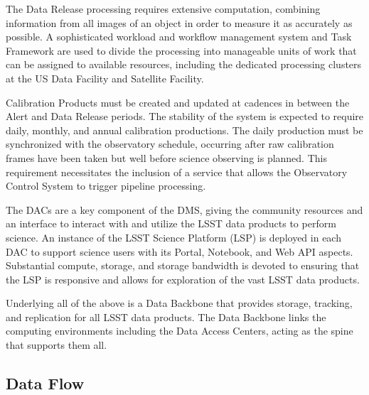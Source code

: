 \documentclass[DM,toc,lsstdraft]{lsstdoc}
\begin{document}
The Data Release processing requires extensive computation, combining
information from all images of an object in order to measure it as
accurately as possible.  A sophisticated workload and workflow management
system and Task Framework are used to divide the processing into
manageable units of work that can be assigned to available resources,
including the dedicated processing clusters at the US Data Facility and Satellite Facility.

Calibration Products must be created and updated at cadences in between
the Alert and Data Release periods.  The stability of the system is expected to
require daily, monthly, and annual calibration productions.  The daily
production must be synchronized with the observatory schedule, occurring after
raw calibration frames have been taken but well before science observing is
planned.  This requirement necessitates the inclusion of a service that allows
the Observatory Control System to trigger pipeline processing.

The DACs are a key component of the DMS, giving the community resources and an
interface to interact with and utilize the LSST data products to perform
science.  An instance of the LSST Science Platform (LSP) is deployed in each
DAC to support science users with its Portal, Notebook, and Web
API aspects.  Substantial compute, storage, and storage bandwidth is devoted to
ensuring that the LSP is responsive and allows for exploration of the vast
LSST data products.

Underlying all of the above is a Data Backbone that provides storage, tracking,
and replication for all LSST data products.  The Data Backbone links the
computing environments including the Data Access Centers, acting as the spine that
supports them all.

\subsection{Data Flow}\label{data-flow}
\end{document}
